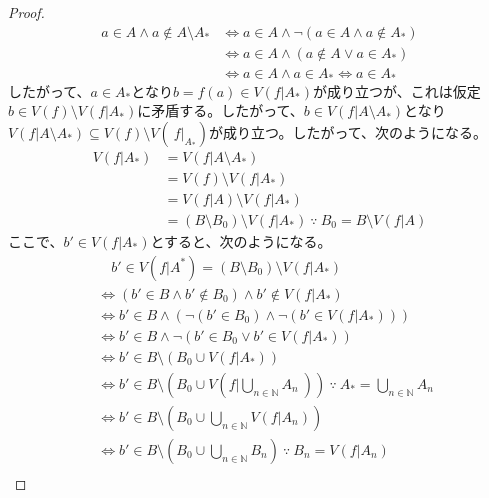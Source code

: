 \documentclass[dvipdfmx]{jsarticle}
\begin{document}
\begin{proof}
\begin{align*}
a \in A \land a \notin A \setminus A_{*} &\Leftrightarrow a \in A \land \neg\left( a \in A \land a \notin A_{*} \right)\\
&\Leftrightarrow a \in A \land \left( a \notin A \vee a \in A_{*} \right)\\
&\Leftrightarrow a \in A \land a \in A_{*} \Leftrightarrow a \in A_{*}
\end{align*}
したがって、$a \in A_{*}$となり$b = f(a) \in V\left( f|A_{*} \right)$が成り立つが、これは仮定$b \in V(f) \setminus V\left( f|A_{*} \right)$に矛盾する。したがって、$b \in V\left( f|A \setminus A_{*} \right)$となり$V\left( f|A \setminus A_{*} \right) \subseteq V(f) \setminus V\left( \left. \ f \right|_{A_{*}} \right)$が成り立つ。したがって、次のようになる。
\begin{align*}
V\left( f|A_{*} \right) &= V\left( f|A \setminus A_{*} \right)\\
&= V(f) \setminus V\left( f|A_{*} \right)\\
&= V\left( f|A \right) \setminus V\left( f|A_{*} \right)\\
&= \left( B \setminus B_{0} \right) \setminus V\left( f|A_{*} \right)\ \because\ B_{0} = B \setminus V\left( f|A \right)
\end{align*}
ここで、$b' \in V(f|A_{*})$とすると、次のようになる。
\begin{align*}
&\quad b' \in V\left( f|A^{*} \right) = \left( B \setminus B_{0} \right) \setminus V\left( f|A_{*} \right)\\
&\Leftrightarrow \left( b' \in B \land b' \notin B_{0} \right) \land b' \notin V\left( f|A_{*} \right)\\
&\Leftrightarrow b' \in B \land \left( \neg\left( b' \in B_{0} \right) \land \neg\left( b' \in V\left( f|A_{*} \right) \right) \right)\\
&\Leftrightarrow b' \in B \land \neg\left( b' \in B_{0} \vee b' \in V\left( f|A_{*} \right) \right)\\
&\Leftrightarrow b' \in B \setminus \left( B_{0} \cup V\left( f|A_{*} \right) \right)\\
&\Leftrightarrow b' \in B \setminus \left( B_{0} \cup V\left( f|\bigcup_{n \in \mathbb{N}} A_{n}\  \right) \right)\ \because\ A_{*} = \bigcup_{n \in \mathbb{N}} A_{n}\\
&\Leftrightarrow b' \in B \setminus \left( B_{0} \cup \bigcup_{n \in \mathbb{N}} {V\left( f|A_{n} \right)} \right)\\
&\Leftrightarrow b' \in B \setminus \left( B_{0} \cup \bigcup_{n \in \mathbb{N}} B_{n} \right)\ \because\ B_{n} = V\left( f|A_{n} \right)\\

\end{align*}
\end{proof}
\end{document}
